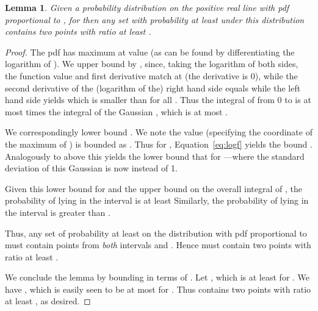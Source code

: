 \documentclass[11pt,letter]{article}
\newcounter{nTheorems}
\numberwithin{nTheorems}{section}
\newtheorem{lemma}[nTheorems]{Lemma}
\begin{document}
\begin{lemma}\label{lem:tail}
  Given a probability distribution on the positive real line with pdf proportional to , for  then any set with probability at least  under this distribution contains two points with ratio at least .
\end{lemma}
\begin{proof}

  The pdf has maximum at  value  (as can be found by differentiating the logarithm of ). We upper bound  by , since, taking the logarithm of both sides, the function value and first derivative match at  (the derivative is 0), while the second derivative of the (logarithm of the) right hand side equals  while the left hand side yields  which is smaller than  for all . Thus the integral of  from 0 to  is at most  times the integral of the Gaussian , which is at most .

  We correspondingly lower bound . We note the value  (specifying the  coordinate of the maximum of ) is bounded as . Thus for , Equation~\ref{eq:logf} yields the bound . Analogously to above this yields the lower bound that  for ---where the standard deviation of this Gaussian is now  instead of 1.

  Given this lower bound  for  and the upper bound  on the overall integral of , the probability of  lying in the interval  is at least  Similarly, the probability of  lying in the interval  is greater than .

  Thus, any set  of probability at least  on the distribution with pdf proportional to  must contain points from \emph{both} intervals  and . Hence  must contain two points with ratio at least .

  We conclude the lemma by bounding  in terms of . Let , which is at least  for . We have , which is easily seen to be at most  for . Thus  contains two points with ratio at least , as desired.


\end{proof}
\end{document}
